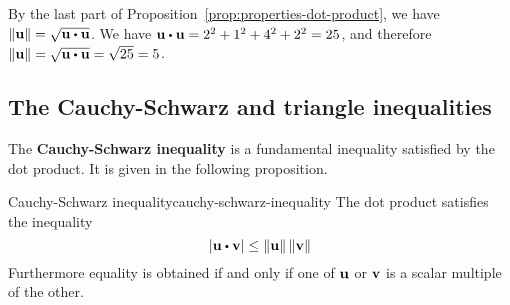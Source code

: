 \begin{solution}
  By the last part of Proposition~\ref{prop:properties-dot-product}, we have
  $\norm{\vect{u}} = \sqrt {\vect{u} \dotprod \vect{u}}$. We have
  $\vect{u} \dotprod \vect{u} = 2^2+1^2+4^2+2^2 = 25$, and therefore
  $\norm{\vect{u}} = \sqrt{\vect{u} \dotprod \vect{u}} = \sqrt{25} = 5$.
\end{solution}

\subsection{The Cauchy-Schwarz and triangle inequalities}

The \textbf{Cauchy-Schwarz inequality}%
 is a fundamental
inequality satisfied by the dot product.  It is given in the following
proposition.

\begin{proposition}{Cauchy-Schwarz inequality}{cauchy-schwarz-inequality}
  The dot product satisfies the inequality
  \begin{equation}\label{cauchy}
    \abs{\vect{u}\dotprod \vect{v}}\leq \norm{\vect{u}} \norm{\vect{v}}
  \end{equation}
  Furthermore equality is obtained if and only if one of $\vect{u}$ or $\vect{v}$ is a scalar multiple of the other.
\end{proposition}


